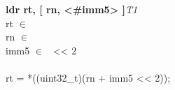 


\begin{instructionblock}{\imagewidth}%
    \textbf{ldr rt, [ rn, <\#imm5> ]}\hfill\textit{T1}\\
    rt $\in$ \baseplus\\
    rn $\in$ \baseregisters\\
    imm5 $\in$ \immFive\ {<}{<} 2\\
    {}\\
    rt = *((uint32\_t)(rn + imm5 {<}{<} 2));
\end{instructionblock}

